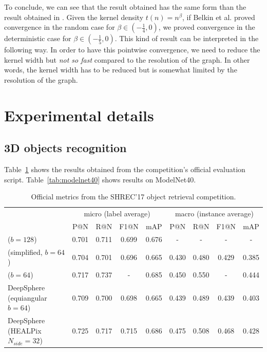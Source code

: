 \documentclass{article} %
\newcommand{\Tabref}[1]{Table~\ref{tab:#1}}
\begin{document}
To conclude, we can see that the result obtained has the same form than the result obtained in \cite{belkin2005towards}. Given the kernel density $t(n)=n^\beta$, if Belkin et al. proved convergence in the random case for $\beta \in (-\frac{1}{4}, 0)$, we proved convergence in the deterministic case for $\beta \in (-\frac{1}{5}, 0)$. This kind of result can be interpreted in the following way. In order to have this pointwise convergence, we need to reduce the kernel width but \emph{not so fast} compared to the resolution of the graph. In other words, the kernel width has to be reduced but is somewhat limited by the resolution of the graph.


\section{Experimental details}

\subsection{3D objects recognition}

\Tabref{shrec17_retrieval} shows the results obtained from the competition's official evaluation script.
\Tabref{modelnet40} shows results on ModelNet40.

\begin{table}
    \centering
	\scriptsize
    \begin{tabular}{l cccc cccc}
    & \multicolumn{4}{c}{micro (label average)} & \multicolumn{4}{c}{macro (instance average)} \\
	\cmidrule(lr){2-5} \cmidrule(lr){6-9}
    & P@N & R@N & F1@N & mAP & P@N & R@N & F1@N & mAP \\
	\toprule
    \citet{cohen2018sphericalcnn} ($b=128$) & 0.701 & 0.711 & 0.699 & 0.676 & - & - & - & - \\
    \citet{cohen2018sphericalcnn} (simplified, $b=64$) & 0.704 & 0.701 & 0.696 & 0.665 & 0.430 & 0.480 & 0.429 & 0.385 \\
    \citet{esteves2018sphericalcnn} ($b=64$) & 0.717 & 0.737 & - & 0.685 & 0.450 & 0.550 & - & 0.444 \\
    DeepSphere (equiangular $b=64$) & 0.709 & 0.700 & 0.698 & 0.665 & 0.439 & 0.489 & 0.439 & 0.403 \\
    DeepSphere (HEALPix $N_{side}=32$) & 0.725 & 0.717 & 0.715 & 0.686 & 0.475 & 0.508 & 0.468 & 0.428\\
	\bottomrule
    \end{tabular}
    \caption{Official metrics from the SHREC'17 object retrieval competition.}
    \label{tab:shrec17_retrieval}
\end{table}
\end{document}

